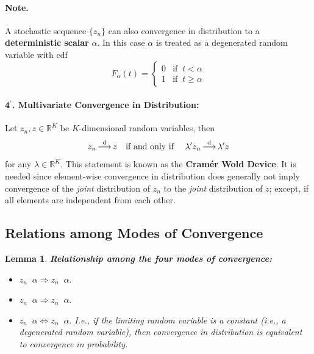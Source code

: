 \documentclass[
  14pt,
]{memoir}
\DeclareMathOperator{\toprob}{\overset{p}{\longrightarrow}}
\DeclareMathOperator{\toas}{\overset{a.s.}{\longrightarrow}}
\DeclareMathOperator{\toms}{\overset{m.s.}{\longrightarrow}}
\DeclareMathOperator{\todistr}{\overset{d}{\longrightarrow}}
\newtheorem{lemma}[theorem]{Lemma}
\begin{document}
\paragraph*{Note.}

A stochastic sequence \(\{z_n\}\) can also convergence in distribution to a \textbf{deterministic scalar} \(\alpha\). In this case \(\alpha\) is treated as a degenerated random variable with cdf
\[
F_\alpha(t)=\left\{\begin{matrix}0&\text{if}\;\;t<\alpha\\ 1&\text{if}\;\;t\geq\alpha\end{matrix}\right.
\]

\paragraph*{4$^\prime$. Multivariate Convergence in Distribution:}

Let \(z_n,z\in\mathbb{R}^K\) be \(K\)-dimensional random variables, then
\[
z_n\todistr z\text{\quad if and only if \quad}\lambda'z_n\todistr\lambda'z
\]
for any \(\lambda\in\mathbb{R}^K\). This statement is known as the \textbf{Cram\'er Wold Device}. It is needed since element-wise convergence in distribution does generally not imply convergence of the \emph{joint} distribution of \(z_n\) to the \emph{joint} distribution of \(z\); except, if all elements are independent from each other.

\hypertarget{relations-among-modes-of-convergence}{%
\subsection*{Relations among Modes of Convergence}\label{relations-among-modes-of-convergence}}

\begin{lemma}\label{Relations}\textbf{\textrm{Relationship among the four modes of convergence:}}
\begin{itemize}
\item[(i)] $z_n\toms\alpha\Rightarrow z_n\toprob\alpha.$
\item[(ii)] $z_n\toas\alpha\Rightarrow z_n\toprob\alpha.$ 
\item[(iii)] $z_n\todistr\alpha\Leftrightarrow z_n\toprob\alpha.$ I.e., if the limiting random variable is a constant (i.e., a degenerated random variable), then convergence in distribution is equivalent to convergence in probability.
\end{itemize}
\end{lemma}
\end{document}
